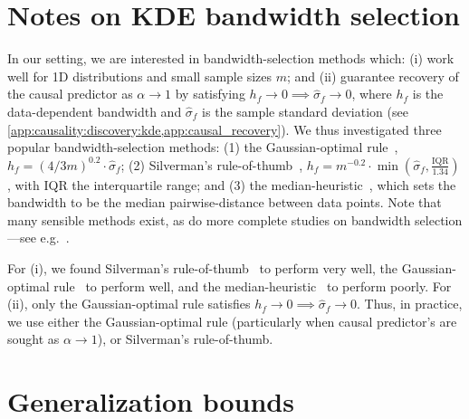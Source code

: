 \documentclass{article}
\begin{document}
\section{Notes on KDE bandwidth selection}
\label{app:kde}
In our setting, we are interested in bandwidth-selection methods which: (i) work well for 1D distributions and small sample sizes $m$; and (ii) guarantee recovery of the causal predictor as $\alpha \to 1$ by satisfying $h_f \to 0 \implies \hat{\sigma}_f \to 0$, where $h_f$ is the data-dependent bandwidth and $\hat{\sigma}_f$ is the sample standard deviation (see \cref{app:causality:discovery:kde,app:causal_recovery}). We thus investigated three popular bandwidth-selection methods: (1) the Gaussian-optimal rule~\citep{silverman1986density}, $h_f = (4/3m)^{0.2} \cdot \hat{\sigma}_f$; (2) Silverman's rule-of-thumb~\citep{silverman1986density}, $h_f = m^{-0.2} \cdot \min (\hat{\sigma}_f, \frac{\text{IQR}}{1.34})$, with IQR the interquartile range; and (3) the median-heuristic~\citep{scholkopf1997kernel, takeuchi2006nonparametric, sriperumbudur2009kernel}, which sets the bandwidth to be the median pairwise-distance between data points. Note that many sensible methods exist, as do more complete studies on bandwidth selection---see e.g.~\cite{silverman1986density}.



For (i), we found Silverman's rule-of-thumb~\citep{silverman1986density} to perform very well, the Gaussian-optimal rule~\citep{silverman1986density} to perform well, and the median-heuristic~\citep{scholkopf1997kernel, takeuchi2006nonparametric, sriperumbudur2009kernel} to perform poorly. For (ii), only the Gaussian-optimal rule satisfies $h_f \to 0 \implies \hat{\sigma}_f \to 0$. Thus, in practice, we use either the Gaussian-optimal rule (particularly when causal predictor's are sought as $\alpha \to 1$), or Silverman's rule-of-thumb.

%
%

%


%
%
%
%
%

%
%
%
%
%
%
%
%
%
%


%
%
%

%
%

%



%
%

%

%

%

\section{Generalization bounds}
\label{app:gen_bounds}
\end{document}
